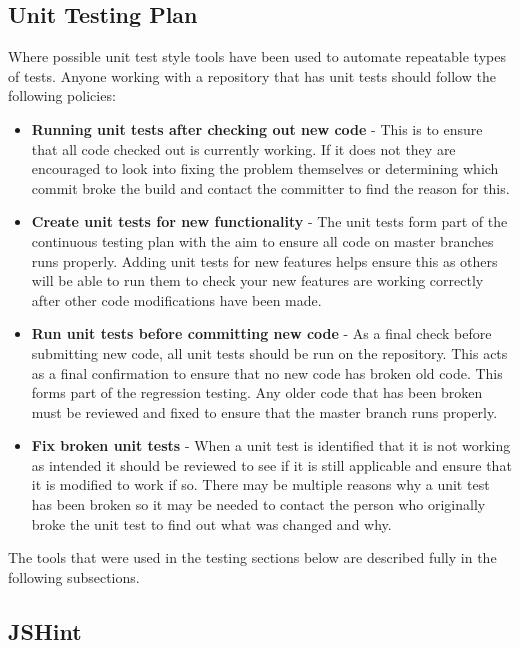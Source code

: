 \subsection{Unit Testing Plan}
\label{Section:Testing_unittesting}

Where possible unit test style tools have been used to automate repeatable types of tests. Anyone working with a repository that has unit tests should follow the following policies:

\begin{itemize}
\item \textbf{Running unit tests after checking out new code} - This is to ensure that all code checked out is currently working. If it does not they are encouraged to look into fixing the problem themselves or determining which commit broke the build and contact the committer to find the reason for this.

\item \textbf{Create unit tests for new functionality} - The unit tests form part of the continuous testing plan with the aim to ensure all code on master branches runs properly. Adding unit tests for new features helps ensure this as others will be able to run them to check your new features are working correctly after other code modifications have been made.

\item \textbf{Run unit tests before committing new code} - As a final check before submitting new code, all unit tests should be run on the repository. This acts as a final confirmation to ensure that no new code has broken old code. This forms part of the regression testing. Any older code that has been broken must be reviewed and fixed to ensure that the master branch runs properly.

\item \textbf{Fix broken unit tests} - When a unit test is identified that it is not working as intended it should be reviewed to see if it is still applicable and ensure that it is modified to work if so. There may be multiple reasons why a unit test has been broken so it may be needed to contact the person who originally broke the unit test to find out what was changed and why.
\end{itemize}

The tools that were used in the testing sections below are described fully in the following subsections.

\subsection{JSHint}

